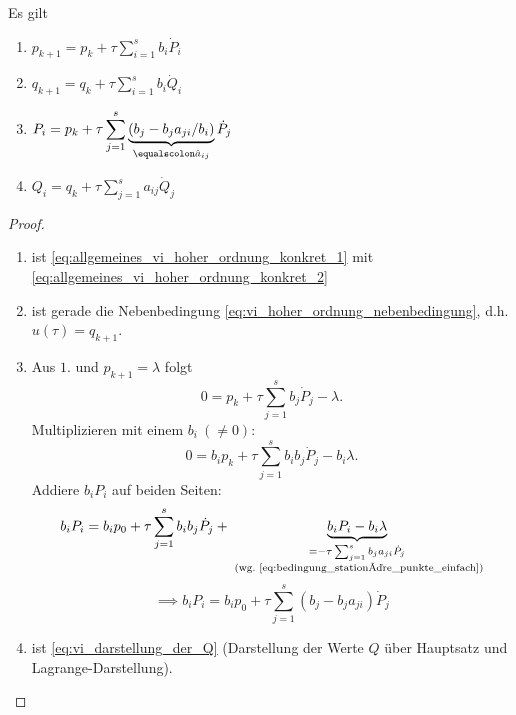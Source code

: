 \begin{lemma}
Es gilt
\begin{enumerate}
\item $\displaystyle p_{k+1} = p_k + \tau\sum_{i=1}^s b_i\dot{P}_i$
\item $\displaystyle q_{k+1} = q_k + \tau\sum_{i=1}^s b_i\dot{Q}_i$
\item $\displaystyle P_i = p_k + \tau\sum_{j=1}^s \underbrace{( b_j - b_ja_{ji}/b_i)}_{\equalscolon \hat{a}_{ij}} \dot{P}_j$
\item $\displaystyle Q_i = q_k + \tau\sum_{j=1}^s a_{ij}\dot{Q}_j$
\end{enumerate}
\end{lemma}

\begin{proof}
\begin{enumerate}
\item ist \eqref{eq:allgemeines_vi_hoher_ordnung_konkret_1} mit \eqref{eq:allgemeines_vi_hoher_ordnung_konkret_2}
\item ist gerade die Nebenbedingung \eqref{eq:vi_hoher_ordnung_nebenbedingung}, d.h. $u(\tau)=q_{k+1}$.
\item Aus $1.$ und $p_{k+1}=\lambda$ folgt
\begin{equation*}
0 = p_k + \tau\sum_{j=1}^s b_j\dot{P}_j - \lambda.
\end{equation*}
Multiplizieren mit einem $b_i\ (\neq 0)$:
\begin{equation*}
0 = b_ip_k + \tau\sum_{j=1}^s b_ib_j\dot{P}_j - b_i\lambda.
\end{equation*}
Addiere $b_iP_i$ auf beiden Seiten:
\begin{equation*}
b_i P_i
=
b_ip_0 + \tau\sum_{j=1}^s b_ib_j\dot{P}_j
  + \underbrace{b_iP_i - b_i\lambda}_{\substack{=-\tau\sum_{j=1}^sb_ja_{ji}\dot{P}_j\\\text{ (wg.~\eqref{eq:bedingung_stationäre_punkte_einfach})}}}
\end{equation*}
\begin{equation*}
\implies b_iP_i = b_ip_0 + \tau\sum_{j=1}^s ( b_j - b_ja_{ji}) \dot{P}_j
\end{equation*}

\item ist \eqref{eq:vi_darstellung_der_Q} (Darstellung der Werte $Q$ über Hauptsatz und Lagrange-Darstellung).
\qedhere
\end{enumerate}
\end{proof}

\bigskip

